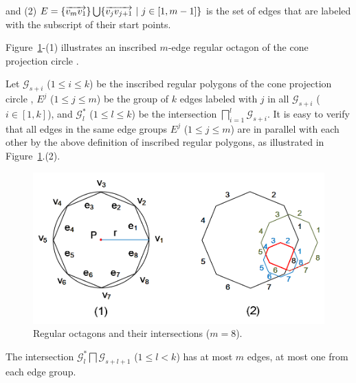 \ni and (2) $E= \{\protect\overrightarrow{v_mv_1}\} \bigcup \{\protect\overrightarrow{v_jv_{j+1}}\ |\ j\in [1, m-1]\}$ is the set of edges that are labeled with the subscript of their start points.


Figure~\ref{fig:polygons}-(1) illustrates an inscribed $m$-edge regular octagon of the cone projection  circle  .

Let $\mathcal{G}_{s+i}$ ($1\le i \le k$) be the inscribed regular polygons of the cone projection  circle ,
$E^j$ ($1\le j \le m$) be the group of $k$ edges labeled with $j$ in all $\mathcal{G}_{s+i}$ ($i\in[1, k]$), and $\mathcal{G}^*_l$ ($1\le l\le k$) be the intersection
 $\bigsqcap_{i=1}^{l}\mathcal{G}_{s+i}$.
%
It is easy to verify that all edges in the same edge groups $E^j$ ($1\le j\le m$) are in parallel with each other by the above definition of inscribed regular polygons, as illustrated in Figure~\ref{fig:polygons}.(2).






\begin{figure}[tb!]
\centering
\includegraphics[scale=0.88]{figures/Fig-polygons.png}
\vspace{-1ex}
\caption{\small Regular octagons and their intersections ($m =8$).}
\vspace{-3ex}
\label{fig:polygons}
\end{figure}


\begin{prop}
\label{prop-rp-intersection}
The intersection $\mathcal{G}^*_{l} \bigsqcap \mathcal{G}_{s+l+1}$ ($ 1\le l< k$) has at most $m$ edges, \ie at most one from each edge group.
\end{prop}



